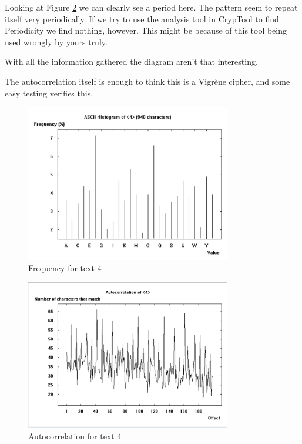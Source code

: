 Looking at Figure \ref{fig:4autocorr} we can clearly see a period here.
The pattern seem to repeat itself very periodically.
If we try to use the analysis tool in CrypTool to find Periodicity we find nothing, however.
This might be because of this tool being used wrongly by yours truly.

With all the information gathered the diagram aren't that interesting.

The autocorrelation itself is enough to think this is a Vigrène cipher, and some easy testing verifies this.

\begin{figure}[ht!]
    \begin{center}
        \includegraphics[width=0.8\textwidth]{assets/4_frequency.png}
        \caption{Frequency for text 4}
        \label{fig:4freq}
    \end{center}
\end{figure}

\begin{figure}[ht!]
    \begin{center}
        \includegraphics[width=0.8\textwidth]{assets/4_autocorr.png}
        \caption{Autocorrelation for text 4}
        \label{fig:4autocorr}
    \end{center}
\end{figure}

